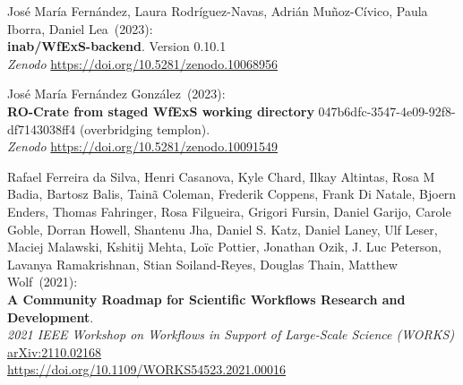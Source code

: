 \begin{thebibliography}{9}
José María Fernández, Laura Rodríguez-Navas, Adrián Muñoz-Cívico, Paula Iborra, Daniel Lea~(2023): \\
\textbf{inab/WfExS-backend}. Version 0.10.1\\
\emph{Zenodo}
\url{https://doi.org/10.5281/zenodo.10068956}

José María Fernández González~(2023): \\
\textbf{RO-Crate from staged WfExS working directory} 047b6dfc-3547-4e09-92f8-df7143038ff4 (overbridging templon).\\
\emph{Zenodo}
\url{https://doi.org/10.5281/zenodo.10091549}

Rafael Ferreira da Silva, Henri Casanova, Kyle Chard, Ilkay
Altintas, Rosa M Badia, Bartosz Balis, Tainã Coleman, Frederik Coppens,
Frank Di Natale, Bjoern Enders, Thomas Fahringer, Rosa Filgueira,
Grigori Fursin, Daniel Garijo, Carole Goble, Dorran Howell, Shantenu
Jha, Daniel S. Katz, Daniel Laney, Ulf Leser, Maciej Malawski, Kshitij
Mehta, Loïc Pottier, Jonathan Ozik, J. Luc Peterson, Lavanya
Ramakrishnan, Stian Soiland-Reyes, Douglas Thain, Matthew Wolf~(2021): \\
\textbf{A Community Roadmap for Scientific Workflows Research and Development}.\\
\emph{2021 IEEE Workshop on Workflows in Support of Large-Scale Science (WORKS)}\\
\href{https://doi.org/10.48550/arXiv.2110.02168}{arXiv:2110.02168}\\
\url{https://doi.org/10.1109/WORKS54523.2021.00016}


\end{thebibliography}
